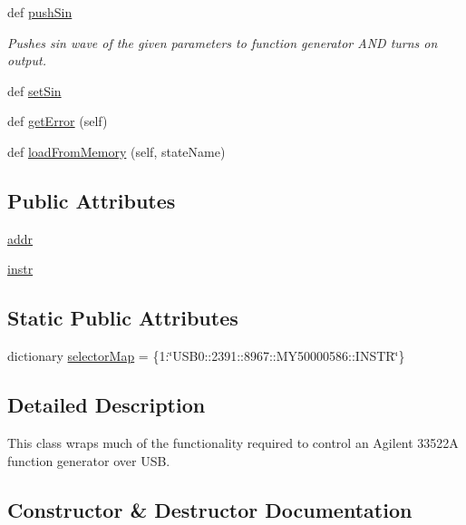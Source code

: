 \begin{DoxyCompactItemize}
def \hyperlink{class_function_generator_1_1_function_generator_a35c5bc4df66d86595b825e13aba94c1a}{push\+Sin}
\begin{DoxyCompactList}\small\item\em Pushes sin wave of the given parameters to function generator A\+N\+D turns on output. \end{DoxyCompactList}\item 
def \hyperlink{class_function_generator_1_1_function_generator_a2f5cd14920dd4119f21ec9dca71481c4}{set\+Sin}
\item 
def \hyperlink{class_function_generator_1_1_function_generator_a93a5580a96697fa28f311dd7bdb1c63f}{get\+Error} (self)
\item 
def \hyperlink{class_function_generator_1_1_function_generator_a600d8bcdc6ee83dfdff2a55e6f1c14ba}{load\+From\+Memory} (self, state\+Name)
\end{DoxyCompactItemize}
\subsection*{Public Attributes}
\begin{DoxyCompactItemize}
\item 
\hyperlink{class_function_generator_1_1_function_generator_a6232661c93750461489cadd41b721d56}{addr}
\item 
\hyperlink{class_function_generator_1_1_function_generator_a31f74674e20ebd808c28abf817cafccf}{instr}
\end{DoxyCompactItemize}
\subsection*{Static Public Attributes}
\begin{DoxyCompactItemize}
\item 
dictionary \hyperlink{class_function_generator_1_1_function_generator_af0f7aaea68bd468c28524373f6005d8f}{selector\+Map} = \{1\+:\char`\"{}U\+S\+B0\+::2391\+::8967\+::\+M\+Y50000586\+::\+I\+N\+S\+T\+R\char`\"{}\}
\end{DoxyCompactItemize}


\subsection{Detailed Description}
This class wraps much of the functionality required to control an Agilent 33522\+A function generator over U\+S\+B. 

\subsection{Constructor \& Destructor Documentation}
\hypertarget{class_function_generator_1_1_function_generator_ac556755f798d3845b3ecde0fb7338747}{}
